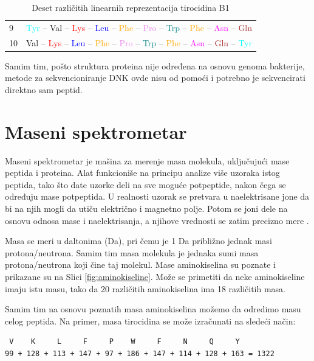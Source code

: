 \documentclass[12pt,oneside]{memoir}
\begin{document}
\begin{table}[H]
\begin{tabular}{ll}
9 & \textcolor{cyan}{Tyr} – \textcolor{green!70!black}{Val} – \textcolor{red}{Lys} – \textcolor{blue}{Leu} – \textcolor{orange}{Phe} – \textcolor{violet}{Pro} – \textcolor{teal}{Trp} – \textcolor{orange}{Phe} – \textcolor{magenta}{Asn} – \textcolor{brown}{Gln} \\
10 & \textcolor{green!70!black}{Val} – \textcolor{red}{Lys} – \textcolor{blue}{Leu} – \textcolor{orange}{Phe} – \textcolor{violet}{Pro} – \textcolor{teal}{Trp} – \textcolor{orange}{Phe} – \textcolor{magenta}{Asn} – \textcolor{brown}{Gln} – \textcolor{cyan}{Tyr} \\
\bottomrule
\end{tabular}
\caption{Deset različitih linearnih reprezentacija tirocidina B1}
\label{tab:linear_representations}
\end{table}

Samim tim, pošto struktura proteina nije određena na osnovu genoma bakterije, metode za sekvencioniranje DNK ovde nisu od pomoći i potrebno je sekvencirati direktno sam peptid.

\section{Maseni spektrometar}
Maseni spektrometar je mašina za merenje masa molekula, uključujući mase peptida i proteina. Alat funkcioniše na principu analize više uzoraka istog peptida, tako što date uzorke deli na sve moguće potpeptide, nakon čega se određuju mase potpeptida. U realnosti uzorak se pretvara u naelektrisane jone da bi na njih mogli da utiču električno i magnetno polje. Potom se joni dele na osnovu odnosa mase i naelektrisanja, a njihove vrednosti se zatim precizno mere \cite{spectrometer}.

Masa se meri u daltonima (Da), pri čemu je 1 Da približno jednak masi protona/neutrona. Samim tim masa molekula je jednaka sumi masa protona/neutrona koji čine taj molekul. Mase aminokiselina su poznate i prikazane su na Slici \ref{fig:aminokiseline}. Može se primetiti da neke aminokiseline imaju istu masu, tako da 20 različitih aminokiselina ima 18 različitih masa.

Samim tim na osnovu poznatih masa aminokiselina možemo da odredimo masu celog peptida. Na primer, masa tirocidina se može izračunati na sledeći način:
\begin{verbatim}
 V    K     L     F     P    W     F     N     Q     Y     
99 + 128 + 113 + 147 + 97 + 186 + 147 + 114 + 128 + 163 = 1322
\end{verbatim}
\end{document}
